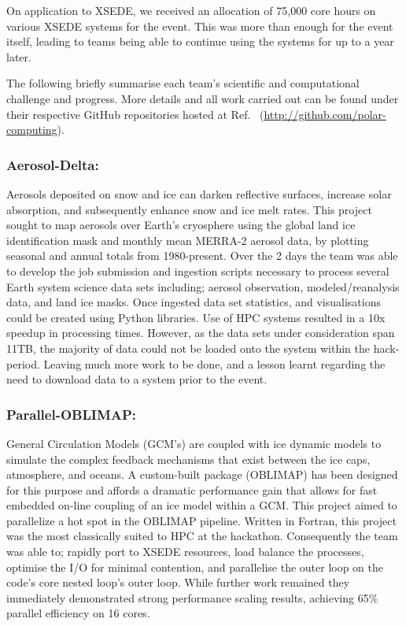 \documentclass[conference]{IEEEtran}
\begin{document}
On application to XSEDE, we received an allocation of 75,000 core hours on various XSEDE systems for the event.  This was more than enough for the event itself, leading to teams being able to continue using the systems for up to a year later.

The following briefly summarise each team’s scientific and computational challenge and progress.  More details and all work carried out can be found under their respective GitHub repositories hosted at Ref.~\cite{polar-computing-github} (\url{http://github.com/polar-computing}). 
\subsubsection{Aerosol-Delta:}
Aerosols deposited on snow and ice can darken reflective surfaces, increase solar absorption, and subsequently enhance snow and ice melt rates. This project sought to map aerosols over Earth's cryosphere using the global land ice identification mask and monthly mean MERRA-2 aerosol data, by plotting seasonal and annual totals from 1980-present. Over the 2 days the team was able to develop the job submission and ingestion scripts necessary to process several Earth system science data sets including; aerosol observation, modeled/reanalysis data, and land ice masks.  Once ingested data set statistics, and visualisations could be created using Python libraries.  Use of HPC systems resulted in a 10x speedup in processing times.  However, as the data sets under consideration span 11TB, the majority of data could not be loaded onto the system within the hack-period. Leaving much more work to be done, and a lesson learnt regarding the need to download data to a system prior to the event.
\subsubsection{Parallel-OBLIMAP:}
General Circulation Models (GCM's) are coupled with ice dynamic models to simulate the complex feedback mechanisms that exist between the ice caps, atmosphere, and oceans. A custom-built package (OBLIMAP\cite{Reerink2016-xr}) has been designed for this purpose and affords a dramatic performance gain that allows for fast embedded on-line coupling of an ice model within a GCM. This project aimed to parallelize a hot spot in the OBLIMAP pipeline.  Written in Fortran, this project was the most classically suited to HPC at the hackathon.  Consequently the team was able to; rapidly port to XSEDE resources, load balance the processes, optimise the I/O for minimal contention, and parallelise the outer loop on the code’s core nested loop’s outer loop.  While further work remained they immediately demonstrated strong performance scaling results, achieving 65\% parallel efficiency on 16 cores.
\end{document}
